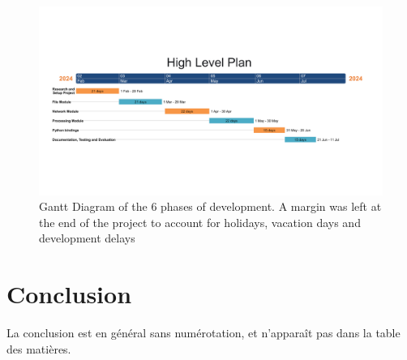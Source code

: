 \begin{spacing}{1.2}
    \begin{figure}[h]\centering
        \includegraphics[width=\textwidth]{Chapitre1/figures/gantt.png}
        \caption{Gantt Diagram of the 6 phases of development. A margin was left at the end of the project to account for 
        holidays, vacation days and development delays}
        \label{fig:gantt}
    \end{figure}

    \section*{Conclusion}
    La conclusion est en général sans numérotation, et n'apparaît pas dans la table des matières.


\end{spacing}
